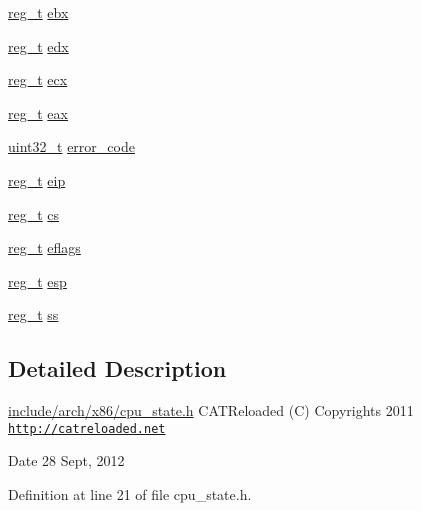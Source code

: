 \begin{DoxyCompactItemize}
\hyperlink{types_8h_a089269ab3c13f602c75d4c7820175d67}{reg\-\_\-t} \hyperlink{structcpu__state__t_ac22dd647fdb5ef040f91a51057828af3}{ebx}
\item 
\hyperlink{types_8h_a089269ab3c13f602c75d4c7820175d67}{reg\-\_\-t} \hyperlink{structcpu__state__t_ad821c98f8125278fc372cb3719e3a406}{edx}
\item 
\hyperlink{types_8h_a089269ab3c13f602c75d4c7820175d67}{reg\-\_\-t} \hyperlink{structcpu__state__t_ae8530eeb4e0c97c3e3694ce9346506ba}{ecx}
\item 
\hyperlink{types_8h_a089269ab3c13f602c75d4c7820175d67}{reg\-\_\-t} \hyperlink{structcpu__state__t_a8f3cd3b02991ffc7da27b369d3236abf}{eax}
\item 
\hyperlink{types_8h_a435d1572bf3f880d55459d9805097f62}{uint32\-\_\-t} \hyperlink{structcpu__state__t_a2cff0114464d473d87b82292e11c3b90}{error\-\_\-code}
\item 
\hyperlink{types_8h_a089269ab3c13f602c75d4c7820175d67}{reg\-\_\-t} \hyperlink{structcpu__state__t_a677f73c40aa87d3eef8eadf4ebdc39f8}{eip}
\item 
\hyperlink{types_8h_a089269ab3c13f602c75d4c7820175d67}{reg\-\_\-t} \hyperlink{structcpu__state__t_a510f889dbc7ef0f824f43208acdc0635}{cs}
\item 
\hyperlink{types_8h_a089269ab3c13f602c75d4c7820175d67}{reg\-\_\-t} \hyperlink{structcpu__state__t_a3c71809af7c0797995f491b253dca172}{eflags}
\item 
\hyperlink{types_8h_a089269ab3c13f602c75d4c7820175d67}{reg\-\_\-t} \hyperlink{structcpu__state__t_ac3816814c0e87a068d1e11753329b015}{esp}
\item 
\hyperlink{types_8h_a089269ab3c13f602c75d4c7820175d67}{reg\-\_\-t} \hyperlink{structcpu__state__t_a59aecceee8d4468f6daed1980f6fa565}{ss}
\end{DoxyCompactItemize}


\subsection{\-Detailed \-Description}
\hyperlink{cpu__state_8h}{include/arch/x86/cpu\-\_\-state.\-h} \-C\-A\-T\-Reloaded (\-C) \-Copyrights 2011 \href{http://catreloaded.net}{\tt http\-://catreloaded.\-net}

\begin{DoxyDate}{\-Date}
28 \-Sept, 2012 
\end{DoxyDate}


\-Definition at line 21 of file cpu\-\_\-state.\-h.



